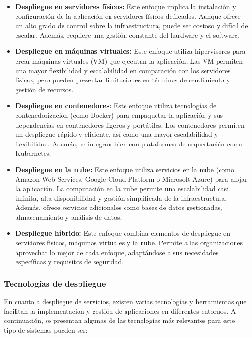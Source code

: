 \begin{itemize}
    \item \textbf{Despliegue en servidores físicos:} Este enfoque implica la instalación y configuración de la aplicación en servidores físicos dedicados. Aunque ofrece un alto grado de control sobre la infraestructura, puede ser costoso y difícil de escalar. Además, requiere una gestión constante del hardware y el software.
    \item \textbf{Despliegue en máquinas virtuales:} Este enfoque utiliza hipervisores para crear máquinas virtuales (VM) que ejecutan la aplicación. Las VM permiten una mayor flexibilidad y escalabilidad en comparación con los servidores físicos, pero pueden presentar limitaciones en términos de rendimiento y gestión de recursos.
    \item \textbf{Despliegue en contenedores:} Este enfoque utiliza tecnologías de contenedorización (como Docker) para empaquetar la aplicación y sus dependencias en contenedores ligeros y portátiles. Los contenedores permiten un despliegue rápido y eficiente, así como una mayor escalabilidad y flexibilidad. Además, se integran bien con plataformas de orquestación como Kubernetes.
    \item \textbf{Despliegue en la nube:} Este enfoque utiliza servicios en la nube (como Amazon Web Services, Google Cloud Platform o Microsoft Azure) para alojar la aplicación. La computación en la nube permite una escalabilidad casi infinita, alta disponibilidad y gestión simplificada de la infraestructura. Además, ofrece servicios adicionales como bases de datos gestionadas, almacenamiento y análisis de datos.
    \item \textbf{Despliegue híbrido:} Este enfoque combina elementos de despliegue en servidores físicos, máquinas virtuales y la nube. Permite a las organizaciones aprovechar lo mejor de cada enfoque, adaptándose a sus necesidades específicas y requisitos de seguridad.
\end{itemize}

\subsubsection{Tecnologías de despliegue}

En cuanto a despliegue de servicios, existen varias tecnologías y herramientas que facilitan la implementación y gestión de aplicaciones en diferentes entornos. A continuación, se presentan algunas de las tecnologías más relevantes para este tipo de sistemas pueden ser:

